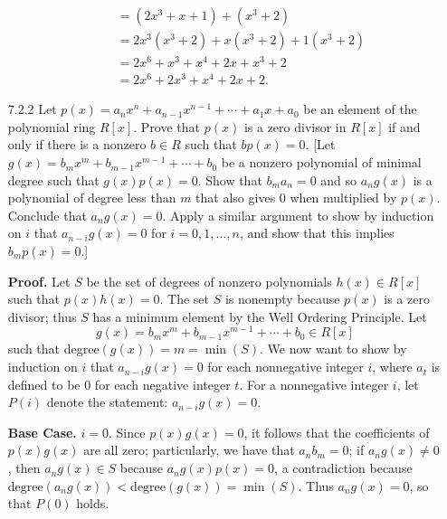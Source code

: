 \begin{enumerate}
\begin{enumerate}
\begin{align*}
                           &= (2x^3 + x + 1) + (x^3 + 2) \\
                           &= 2x^3(x^3 + 2) + x(x^3 + 2) + 1(x^3 + 2)  \\
                           &= 2x^6 + x^3 + x^4 + 2x + x^3 + 2 \\
                           &= 2x^6 + 2x^3 + x^4 + 2x + 2.
               \end{align*}
      \end{enumerate}
   \item[7.2.2]   Let $p(x) = a_nx^n + a_{n-1}x^{n-1}+\cdots+a_1x+a_0$ be an
                  element of the polynomial ring $R[x]$. Prove that $p(x)$ is a
                  zero divisor in $R[x]$ if and only if there is a nonzero 
                  $b \in R$ such that $bp(x) = 0$. [Let $g(x) = b_mx^m +
                  b_{m-1}x^{m-1} + \cdots + b_0$ be a nonzero polynomial of
                  minimal degree such that $g(x)p(x) = 0$. Show that
                  $b_ma_n = 0$ and so $a_ng(x)$ is a polynomial of degree less
                  than $m$ that also gives 0 when multiplied by $p(x)$. Conclude
                  that $a_ng(x) = 0$. Apply a similar argument to show by
                  induction on $i$ that $a_{n-i}g(x) = 0$ for
                  $i = 0, 1, \ldots, n$, and show that this implies
                  $b_mp(x) = 0$.]

      \textbf{Proof.} Let $S$ be the set of degrees of nonzero polynomials
      $h(x) \in R[x]$ such that $p(x)h(x) = 0$. The set $S$ is nonempty because
      $p(x)$ is a zero divisor; thus $S$ has a minimum element by the Well
      Ordering Principle. Let
      $$g(x) = b_mx^m + b_{m-1}x^{m-1} + \cdots + b_0 \in R[x]$$
      such that degree$(g(x)) = m = \min(S)$. We now want to show by induction
      on $i$ that $a_{n-i}g(x) = 0$ for each nonnegative integer $i$, where
      $a_t$ is defined to be 0 for each negative integer $t$. For a nonnegative
      integer $i$, let $P(i)$ denote the statement: $a_{n-i}g(x) = 0$.

      \textbf{Base Case.} $i = 0$. Since $p(x)g(x) = 0$, it follows that the
      coefficients of $p(x)g(x)$ are all zero; particularly, we have that
      $a_nb_m = 0$; if $a_ng(x) \neq 0$, then $a_ng(x) \in S$ because
      $a_ng(x)p(x) = 0$, a contradiction because
      $\text{degree}(a_ng(x)) < \text{degree}(g(x)) = \min(S)$.
      Thus $a_ng(x) = 0$, so that $P(0)$ holds.


\end{enumerate}

